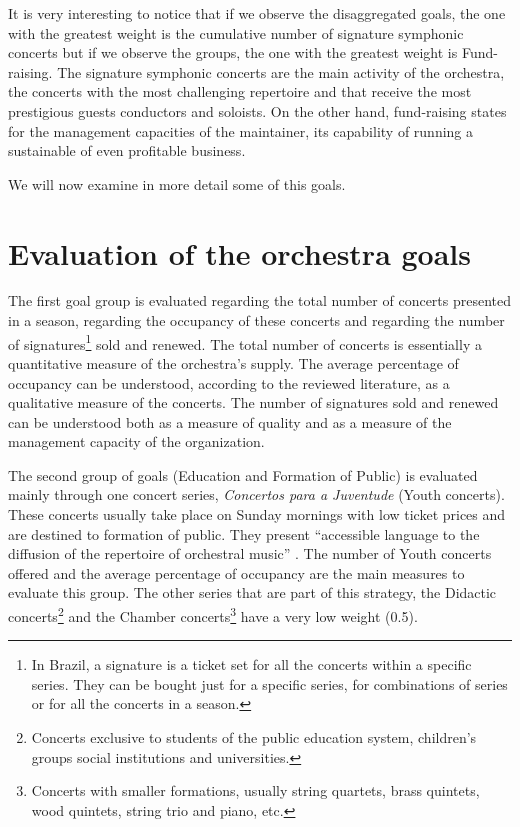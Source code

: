\documentclass[a4paper, 12pt, openright, oneside, german, french, brazil, english]{abntex2}
\begin{document}
        
        It is very interesting to notice that if we observe the disaggregated goals, the one with the greatest weight is the cumulative number of signature symphonic concerts but if we observe the groups, the one with the greatest weight is Fund-raising. The signature symphonic concerts are the main activity of the orchestra, the concerts with the most challenging repertoire and that receive the most prestigious guests conductors and soloists. On the other hand, fund-raising states for the management capacities of the maintainer, its capability of running a sustainable of even profitable business.

        We will now examine in more detail some of this goals.

        \section{Evaluation of the orchestra goals}

        The first goal group is evaluated regarding the total number of concerts presented in a season, regarding the occupancy of these concerts and regarding the number of signatures\footnote{In Brazil, a signature is a ticket set for all the concerts within a specific series. They can be bought just for a specific series, for combinations of series or for all the concerts in a season.} sold and renewed. The total number of concerts is essentially a quantitative measure of the orchestra's supply. The average percentage of occupancy can be understood, according to the reviewed literature, as a qualitative measure of the concerts. The number of signatures sold and renewed can be understood both as a measure of quality and as a measure of the management capacity of the organization. 

        The second group of goals (Education and Formation of Public) is evaluated mainly through one concert series, \textit{Concertos para a Juventude} (Youth concerts). These concerts usually take place on Sunday mornings with low ticket prices and are destined to formation of public. They present ``accessible language to the diffusion of the repertoire of orchestral music'' \cite[p. 9]{filarmonica2017gerencial}. The number of Youth concerts offered and the average percentage of occupancy are the main measures to evaluate this group. The other series that are part of this strategy, the Didactic concerts\footnote{Concerts exclusive to students of the public education system, children's groups social institutions and universities.} and the Chamber concerts\footnote{Concerts with smaller formations, usually string quartets, brass quintets, wood quintets, string trio and piano, etc.} have a very low weight (0.5).
\end{document}
